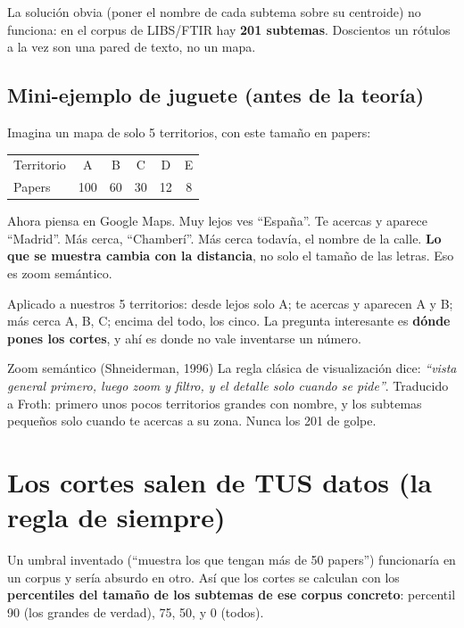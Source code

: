 \documentclass[11pt,a4paper]{article}
\begin{document}
La solución obvia (poner el nombre de cada subtema sobre su centroide) no funciona:
en el corpus de LIBS/FTIR hay \textbf{201 subtemas}. Doscientos un rótulos a la vez son
una pared de texto, no un mapa.

\subsection{Mini-ejemplo de juguete (antes de la teoría)}

Imagina un mapa de solo 5 territorios, con este tamaño en papers:

\begin{center}
\begin{tabular}{lccccc}
\hline
Territorio & A & B & C & D & E \\
Papers     & 100 & 60 & 30 & 12 & 8 \\
\hline
\end{tabular}
\end{center}

Ahora piensa en Google Maps. Muy lejos ves ``España''. Te acercas y aparece ``Madrid''.
Más cerca, ``Chamberí''. Más cerca todavía, el nombre de la calle. \textbf{Lo que se
muestra cambia con la distancia}, no solo el tamaño de las letras. Eso es zoom semántico.

Aplicado a nuestros 5 territorios: desde lejos solo A; te acercas y aparecen A y B;
más cerca A, B, C; encima del todo, los cinco. La pregunta interesante es
\textbf{dónde pones los cortes}, y ahí es donde no vale inventarse un número.

\begin{concepto}{Zoom semántico (Shneiderman, 1996)}
La regla clásica de visualización dice: \emph{``vista general primero, luego zoom y
filtro, y el detalle solo cuando se pide''}. Traducido a Froth: primero unos pocos
territorios grandes con nombre, y los subtemas pequeños solo cuando te acercas a su zona.
Nunca los 201 de golpe.
\end{concepto}

\section{Los cortes salen de TUS datos (la regla de siempre)}

Un umbral inventado (``muestra los que tengan más de 50 papers'') funcionaría en un
corpus y sería absurdo en otro. Así que los cortes se calculan con los
\textbf{percentiles del tamaño de los subtemas de ese corpus concreto}: percentil 90
(los grandes de verdad), 75, 50, y 0 (todos).
\end{document}
